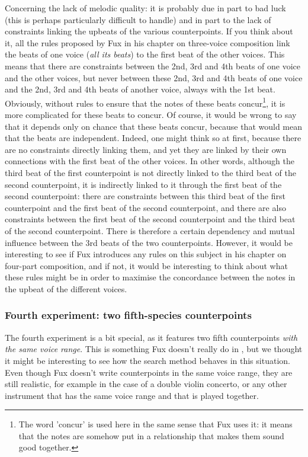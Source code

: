 Concerning the lack of melodic quality: it is probably due in part to bad luck (this \cfs is perhaps particularly difficult to handle) and in part to the lack of constraints linking the upbeats of the various counterpoints. If you think about it, all the rules proposed by Fux in his chapter on three-voice composition link the beats of one voice (\textit{all its beats}) to the first beat of the other voices. This means that there are constraints between the 2nd, 3rd and 4th beats of one voice and the other voices, but never between these 2nd, 3rd and 4th beats of one voice and the 2nd, 3rd and 4th beats of another voice, always with the 1st beat. Obviously, without rules to ensure that the notes of these beats concur\footnote{The word 'concur' is used here in the same sense that Fux uses it: it means that the notes are somehow put in a relationship that makes them sound good together.}, it is more complicated for these beats to concur. Of course, it would be wrong to say that it depends only on chance that these beats concur, because that would mean that the beats are independent. Indeed, one might think so at first, because there are no constraints directly linking them, and yet they are linked by their own connections with the first beat of the other voices. In other words, although the third beat of the first counterpoint is not directly linked to the third beat of the second counterpoint, it is indirectly linked to it through the first beat of the second counterpoint: there are constraints between this third beat of the first counterpoint and the first beat of the second counterpoint, and there are also constraints between the first beat of the second counterpoint and the third beat of the second counterpoint. There is therefore a certain dependency and mutual influence between the 3rd beats of the two counterpoints. However, it would be interesting to see if Fux introduces any rules on this subject in his chapter on four-part composition, and if not, it would be interesting to think about what these rules might be in order to maximise the concordance between the notes in the upbeat of the different voices.
\subsubsection{Fourth experiment: two fifth-species counterpoints}
The fourth experiment is a bit special, as it features two fifth counterpoints \textit{with the same voice range}. This is something Fux doesn't really do in \gap, but we thought it might be interesting to see how the search method behaves in this situation. Even though Fux doesn't write counterpoints in the same voice range, they are still realistic, for example in the case of a double violin concerto, or any other instrument that has the same voice range and that is played together.

